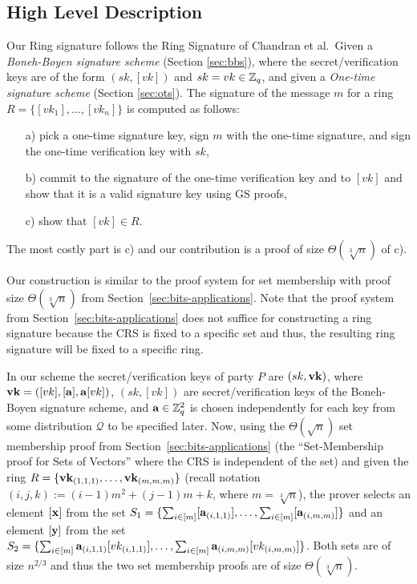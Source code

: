 \subsection{High Level Description}

Our Ring signature follows the Ring Signature of Chandran et al.~Given a \emph{Boneh-Boyen signature scheme} (Section \ref{sec:bbs}), where the secret/verification keys are of the form $(sk,[vk])$ and $sk=vk\in\mathbb{Z}_q$, and given a \emph{One-time signature scheme} (Section \ref{sec:ots}). The signature of the message $m$ for a ring $R=\{[vk_1],\ldots,[vk_n]\}$ is computed as follows:
\begin{itemize}
\item[a)] pick a one-time signature key, sign $m$ with the one-time signature, and sign the one-time verification key with $sk$,
\item[b)] commit to the signature of the one-time verification key and to $[vk]$ and show that it is a valid signature key using GS proofs,
\item[c)] show that $[vk]\in R$.
\end{itemize}
The most costly part is c) and our contribution is a proof of size $\Theta(\sqrt[3]{n})$ of c).

Our construction is similar to the proof system for set membership with proof size $\Theta(\sqrt[3]{n})$ from Section~\ref{sec:bits-applications}. Note that the proof system from Section~\ref{sec:bits-applications} does not suffice for constructing a ring signature because the CRS is fixed to a specific set and thus, the resulting ring signature will be fixed to a specific ring. 

In our scheme the secret/verification keys of party $P$ are $(sk,\mathbf{vk})$, where $\mathbf{vk}=([vk],[\mathbf{a}],\mathbf{a}[vk])$, $(sk,[vk])$ are secret/verification keys of the Boneh-Boyen signature scheme, and $\mathbf{a}\in\mathbb{Z}_q^2$ is chosen independently for each key from some distribution $\mathcal{Q}$ to be specified later. Now, using the $\Theta(\sqrt{n})$ set membership proof from Section~\ref{sec:bits-applications} (the ``Set-Membership proof for Sets of Vectors'' where the CRS is independent of the set) and given the ring $R=\{\mathbf{vk}_{(1,1,1)},\ldots,\mathbf{vk}_{(m,m,m)}\}$ (recall notation $(i,j,k):=(i-1)m^2+(j-1)m+k$, where $m=\sqrt[3]{n}$), the prover selects an element $[\mathbf{x}]$ from the set $S_1=\{\sum_{i\in[m]}[\mathbf{a}_{(i,1,1)}],\ldots,\sum_{i\in[m]}[\mathbf{a}_{(i,m,m)}]\}$ and an element $[\mathbf{y}]$ from the set $S_2=\{\sum_{i\in[m]}\mathbf{a}_{(i,1,1)}[vk_{(i,1,1)}],\ldots,\sum_{i\in[m]}\mathbf{a}_{(i,m,m)}[vk_{(i,m,m)}]\}$. Both sets are of size $n^{2/3}$ and thus the two set membership proofs are of size $\Theta(\sqrt[3]{n})$.

